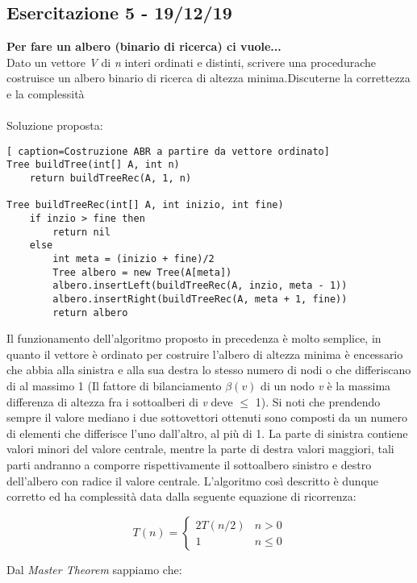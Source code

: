 \documentclass[../cheatSheetAlgoritmi.tex]{subfiles}
\begin{document}
\subsection{Esercitazione 5 - 19/12/19}
\textbf{Per fare un albero (binario di ricerca) ci vuole...}\\
Dato un vettore \textit{V} di \textit{n} interi ordinati e distinti, scrivere una procedurache costruisce un albero binario di ricerca di altezza minima.Discuterne la correttezza e la complessità
\\\\
Soluzione proposta:
\begin{lstlisting}[ caption=Costruzione ABR a partire da vettore ordinato]
Tree buildTree(int[] A, int n)
	return buildTreeRec(A, 1, n)

Tree buildTreeRec(int[] A, int inizio, int fine)
	if inzio > fine then 
    	return nil
  	else
    	int meta = (inizio + fine)/2
    	Tree albero = new Tree(A[meta])
    	albero.insertLeft(buildTreeRec(A, inzio, meta - 1))
    	albero.insertRight(buildTreeRec(A, meta + 1, fine))
    	return albero
\end{lstlisting}
Il funzionamento dell'algoritmo proposto in precedenza è molto semplice, in quanto il vettore è ordinato per costruire l'albero di altezza minima è encessario che abbia alla sinistra e alla sua destra lo stesso numero di nodi o che differiscano di al massimo 1 (Il fattore di bilanciamento $\beta(v)$ di un nodo \textit{v} è la massima differenza
di altezza fra i sottoalberi di \textit{v} deve $\leq$ 1). Si noti che prendendo sempre il valore mediano i due sottovettori ottenuti sono composti da un numero di elementi che differisce l'uno dall'altro, al più di 1. La parte di sinistra contiene valori minori del valore centrale, mentre la parte di destra valori maggiori, tali parti andranno a comporre rispettivamente il sottoalbero sinistro e destro dell'albero con radice il valore centrale.
L'algoritmo così descritto è dunque corretto ed ha complessità data dalla seguente equazione di ricorrenza:
\begin{center}
	\begin{equation*}
  		T(n)=\begin{cases}
    		2T(n/2)  & \text{$n > 0$}\\
    		1 & \text{$n \leq 0$}
  		\end{cases}
	\end{equation*}
\end{center}
Dal \textit{Master Theorem} sappiamo che:\\
\end{document}
